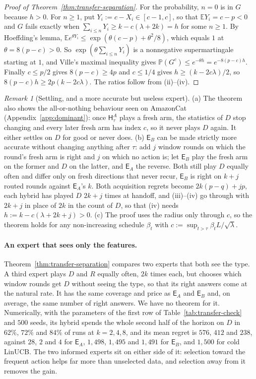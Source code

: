 \documentclass{article}
\theoremstyle{definition}
\theoremstyle{remark}
\newtheorem{remark}{Remark}
\newcommand{\Prb}{\mathbb{P}}
\newcommand{\E}{\mathbb{E}}
\theoremstyle{remark}
\newcommand{\Exp}{\mathsf{E}}
\newcommand{\Hyb}{\mathsf{H}}
\begin{document}
\begin{proof}[Proof of Theorem~\ref{thm:transfer-separation}]
For the probability, $n=0$ is in $G$ because $h>0$. For $n\ge1$, put
$Y_i:=c-X_i\in[c-1,c]$, so that $\E Y_i=c-p<0$ and $G$ fails exactly when
$\sum_{i\le n}Y_i\ge k-c(\lambda+2k)=h$ for some $n\ge1$. By Hoeffding's lemma,
$\E e^{\theta Y_i}\le\exp(\theta(c-p)+\theta^2/8)$, which equals $1$ at
$\theta=8(p-c)>0$. So $\exp(\theta\sum_{i\le n}Y_i)$ is a nonnegative
supermartingale starting at $1$, and Ville's maximal inequality gives
$\Prb(G^c)\le e^{-\theta h}=e^{-8(p-c)h}$. Finally $c\le p/2$ gives
$8(p-c)\ge4p$ and $c\le1/4$ gives $h\ge(k-2c\lambda)/2$, so
$8(p-c)h\ge2p(k-2c\lambda)$. The ratios follow from (ii)--(iv).
\end{proof}

\begin{remark}[Settling, and a more accurate but useless expert]
\label{rem:transfer-extensions}
(a) The theorem also shows the all-or-nothing behaviour seen on AmazonCat
(Appendix~\ref{app:dominant}): once $\Hyb^A_\tau$ plays a fresh arm, the
statistics of $D$ stop changing and every later fresh arm has index $c$, so it
never plays $D$ again. It either settles on $D$ for good or never does.
(b) $\Exp_B$ can be made strictly more accurate without changing anything
after $\tau$: add $j$ window rounds on which the round's fresh arm is right and
$j$ on which no action is; let $\Exp_B$ play the fresh arm on the former and
$D$ on the latter, and $\Exp_A$ the reverse. Both still play $D$ equally often
and differ only on fresh directions that never recur, $\Exp_B$ is right on
$k+j$ routed rounds against $\Exp_A$'s $k$. Both acquisition regrets become
$2k(p-q)+jp$, each hybrid has played $D$ $2k+j$ times at handoff, and
(iii)--(iv) go through with $2k+j$ in place of $2k$ in the count of $D$, so
that (iv) needs $h:=k-c(\lambda+2k+j)>0$.
(c) The proof uses the radius only through $c$, so the theorem holds for any
non-increasing schedule $\beta_t$ with $c:=\sup_{t>\tau}\beta_tL/\sqrt\lambda$.
\end{remark}

\paragraph{An expert that sees only the features.}
Theorem~\ref{thm:transfer-separation} compares two experts that both see the
type. A third expert plays $D$ and $R$ equally often, $2k$ times each, but
chooses which window rounds get $D$ without seeing the type, so that its right
answers come at the natural rate. It has the same coverage and price as
$\Exp_A$ and $\Exp_B$ and, on average, the same number of right answers. We
have no theorem for it. Numerically, with the parameters of the first row of
Table~\ref{tab:transfer-check} and $500$ seeds, its hybrid spends the whole
second half of the horizon on $D$ in $62\%$, $72\%$ and $84\%$ of runs at
$k=2,4,8$, and its mean regret is $576$, $412$ and $238$, against $28$, $2$
and $4$ for $\Exp_A$, $1{,}498$, $1{,}495$ and $1{,}491$ for $\Exp_B$, and
$1{,}500$ for cold LinUCB. The two informed experts sit on either side of it:
selection toward the frequent action helps far more than unselected data, and
selection away from it removes the gain.
\end{document}
